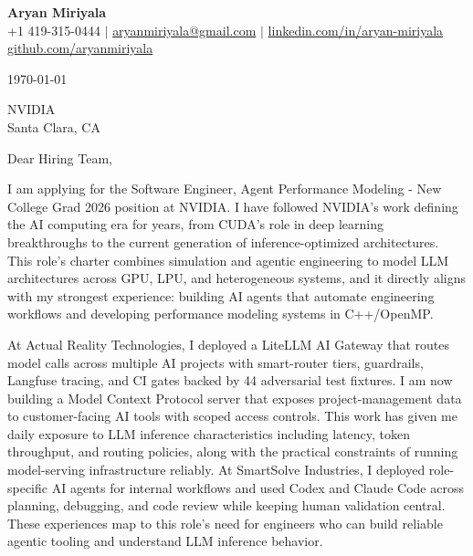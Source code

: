 \documentclass[letterpaper,11pt]{article}
\begin{document}
\begin{center}
  {\LARGE \textbf{Aryan Miriyala}}\\[2pt]
  \small
  +1 419-315-0444 $|$ \href{mailto:aryanmiriyala@gmail.com}{aryanmiriyala@gmail.com} $|$ \href{https://www.linkedin.com/in/aryan-miriyala-7788a21b6/}{linkedin.com/in/aryan-miriyala}\\
  \href{https://github.com/aryanmiriyala}{github.com/aryanmiriyala}
\end{center}

\vspace{12pt}

\today

\vspace{12pt}

NVIDIA \\
Santa Clara, CA

\vspace{12pt}

Dear Hiring Team,

I am applying for the Software Engineer, Agent Performance Modeling - New College Grad 2026 position at NVIDIA. I have followed NVIDIA's work defining the AI computing era for years, from CUDA's role in deep learning breakthroughs to the current generation of inference-optimized architectures. This role's charter combines simulation and agentic engineering to model LLM architectures across GPU, LPU, and heterogeneous systems, and it directly aligns with my strongest experience: building AI agents that automate engineering workflows and developing performance modeling systems in C++/OpenMP.

At Actual Reality Technologies, I deployed a LiteLLM AI Gateway that routes model calls across multiple AI projects with smart-router tiers, guardrails, Langfuse tracing, and CI gates backed by 44 adversarial test fixtures. I am now building a Model Context Protocol server that exposes project-management data to customer-facing AI tools with scoped access controls. This work has given me daily exposure to LLM inference characteristics including latency, token throughput, and routing policies, along with the practical constraints of running model-serving infrastructure reliably. At SmartSolve Industries, I deployed role-specific AI agents for internal workflows and used Codex and Claude Code across planning, debugging, and code review while keeping human validation central. These experiences map to this role's need for engineers who can build reliable agentic tooling and understand LLM inference behavior.
\end{document}
